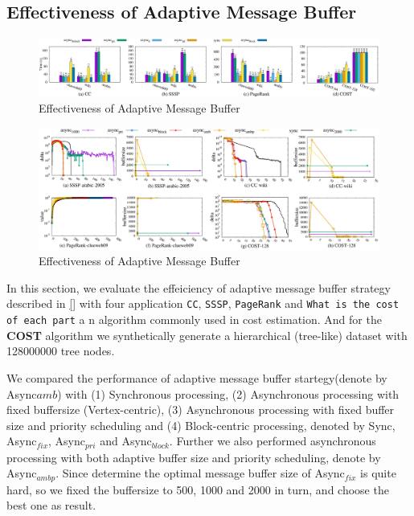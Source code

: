 \subsection{Effectiveness of Adaptive Message Buffer}
\label{sec:expr:AMBuffer}
\begin{figure}[!t]
	\vspace{0.0in}
	\centering
	\includegraphics[width=7.0in]{figuration/summary.eps}
	\vspace{-0.1in}
	\caption{Effectiveness of Adaptive Message Buffer}
	\label{fig:summary}
	\vspace{-0.1in}
\end{figure}
\begin{figure}[!t]
	\centering
	\includegraphics[width=7.0in]{figuration/combine.eps}
	\vspace{-0.1in}
	\caption{Effectiveness of Adaptive Message Buffer}
	\label{fig:details}
	\vspace{-0.1in}
\end{figure}



In this section, we evaluate the effeiciency of adaptive message buffer strategy described in \ref{} with four application \texttt{CC}, \texttt{SSSP}, \texttt{PageRank} and \texttt{What is the cost of each part}\cite{7113340} a n algorithm commonly used in cost estimation. And for the \textbf{COST} algorithm we synthetically generate a hierarchical (tree-like) dataset with 128000000 tree nodes.

We compared the performance of adaptive message buffer startegy(denote by Async${amb}$) with (1) Synchronous processing, (2) Asynchronous processing with fixed buffersize (Vertex-centric), (3) Asynchronous processing with fixed buffer size and priority scheduling and (4) Block-centric processing, denoted by Sync, Async$_{fix}$, Async$_{pri}$ and Async$_{block}$. Further we also performed asynchronous processing with both adaptive buffer size and priority scheduling, denote by Async$_{ambp}$. Since determine the optimal message buffer size of Async$_{fix}$ is quite hard, so we fixed the buffersize to 500, 1000 and 2000 in turn, and choose the best one as result.


